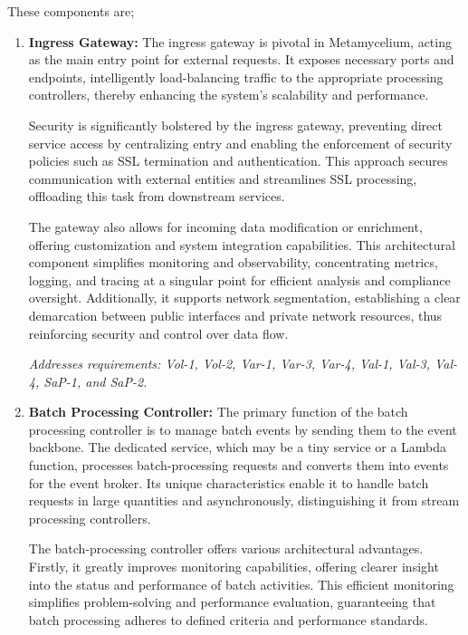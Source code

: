 \documentclass[preprint,12pt]{elsarticle}
\begin{document}
These components are;

\begin{enumerate}
    \item \textbf{Ingress Gateway:} The ingress gateway is pivotal in Metamycelium, acting as the main entry point for external requests. It exposes necessary ports and endpoints, intelligently load-balancing traffic to the appropriate processing controllers, thereby enhancing the system's scalability and performance.

    Security is significantly bolstered by the ingress gateway, preventing direct service access by centralizing entry and enabling the enforcement of security policies such as SSL termination and authentication. This approach secures communication with external entities and streamlines SSL processing, offloading this task from downstream services.
    
    The gateway also allows for incoming data modification or enrichment, offering customization and system integration capabilities. This architectural component simplifies monitoring and observability, concentrating metrics, logging, and tracing at a singular point for efficient analysis and compliance oversight. Additionally, it supports network segmentation, establishing a clear demarcation between public interfaces and private network resources, thus reinforcing security and control over data flow.
    

    \textit{Addresses requirements: Vol-1, Vol-2, Var-1, Var-3, Var-4, Val-1, Val-3, Val-4, SaP-1, and SaP-2.}



    \item \textbf{Batch Processing Controller:} The primary function of the batch processing controller is to manage batch events by sending them to the event backbone. The dedicated service, which may be a tiny service or a Lambda function, processes batch-processing requests and converts them into events for the event broker. Its unique characteristics enable it to handle batch requests in large quantities and asynchronously, distinguishing it from stream processing controllers.

    The batch-processing controller offers various architectural advantages. Firstly, it greatly improves monitoring capabilities, offering clearer insight into the status and performance of batch activities. This efficient monitoring simplifies problem-solving and performance evaluation, guaranteeing that batch processing adheres to defined criteria and performance standards.
    

\end{enumerate}
\end{document}
